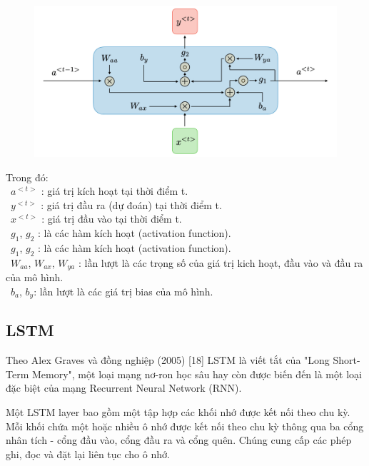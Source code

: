 \documentclass[conference]{IEEEtran}
\begin{document}
\begin{figure}[H]
    \centering
    \begin{minipage}{0.5\textwidth}
    \centering
    \includegraphics[width=1\textwidth]{Image/RNN2.png}
    \label{fig:1}
    \end{minipage}
\end{figure}
Trong đó:\\
	\indent\textbullet\ \(a^{<t>}\) : giá trị kích hoạt tại thời điểm t. \\
	\indent\textbullet\ \(y^{<t>}\) : giá trị đầu ra (dự đoán) tại thời điểm t. \\
 	\indent\textbullet\ \(x^{<t>}\) : giá trị đầu vào tại thời điểm t. \\
 	\indent\textbullet\ \(g_1\), \(g_2\) : là các hàm kích hoạt (activation function). \\
 	\indent\textbullet\ \(g_1\), \(g_2\) : là các hàm kích hoạt (activation function). \\
   	\indent\textbullet\ \(W_{aa}\), \(W_{ax}\), \(W_{ya}\) : lần lượt là các trọng số của giá trị kich hoạt, đầu vào và đầu ra của mô hình. \\
   	\indent\textbullet\ \(b_a\), \(b_y\): lần lượt là các giá trị bias của mô hình. \\
\subsection{LSTM}
Theo Alex Graves và đồng nghiệp (2005) [18] LSTM là viết tắt của "Long Short-Term Memory", một loại mạng nơ-ron học sâu hay còn được biến đến là một loại đặc biệt của mạng Recurrent Neural Network (RNN).

Một LSTM layer bao gồm một tập hợp các khối nhớ được kết nối theo chu kỳ. Mỗi khối chứa một hoặc nhiều ô nhớ được kết nối theo chu kỳ thông qua ba cổng nhân tích - cổng đầu vào, cổng đầu ra và cổng quên. Chúng cung cấp các phép ghi, đọc và đặt lại liên tục cho ô nhớ.
\end{document}

